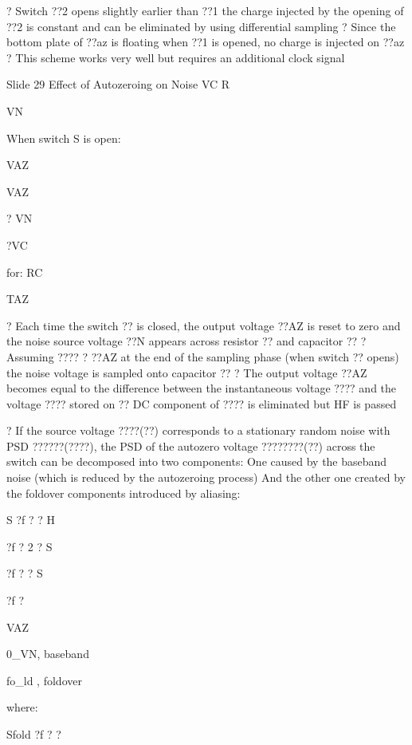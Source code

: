 \documentclass[2pt,landscape]{article}
\begin{document}
\begin{multicols*}{5}
?	Switch ??2 opens slightly earlier than ??1
the charge injected by the opening of ??2 is constant and can be
eliminated by using differential sampling
?	Since the bottom plate of ??az is floating when ??1 is opened, no charge 
is injected on ??az
?	This scheme works very well but requires an additional clock signal


Slide 29	Effect of Autozeroing on Noise
VC
R




VN



When switch S is open:


VAZ


VAZ


? VN


?VC


for: RC


\textbullet TAZ



?	Each time the switch ?? is closed, the output voltage ??AZ is reset 
to zero and the noise source voltage ??N appears across resistor
?? and capacitor ??
?	Assuming ???? ? ??AZ at the end of the sampling phase (when 
switch ?? opens) the noise voltage is sampled onto capacitor ??
?	The output voltage ??AZ becomes equal to the difference between 
the instantaneous voltage ???? and the voltage ???? stored on ??
DC component of ???? is eliminated but HF is passed



?	If the source voltage ????(??) corresponds to a stationary random noise with PSD
??????(????), the PSD of the autozero voltage ????????(??) across the switch can be 
decomposed into two components:
\textbullet 	One caused by the baseband noise (which is reduced by the autozeroing process)
\textbullet 	And the other one created by the foldover components introduced by aliasing:



S	?f ? ? H


?f ? 2 ? S


?f ? ? S


?f ?


VAZ


0\textbullet \textbullet \_\textbullet VN\textbullet ,
baseband


\textbullet fo\_ld \textbullet ,
foldover






where:


Sfold ?f ? ?



\end{multicols*}
\end{document}
